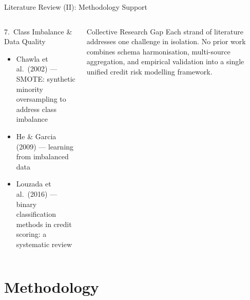 \documentclass[9pt,aspectratio=169]{beamer}
\begin{document}
\begin{frame}{Literature Review (II): Methodology Support}
\begin{columns}[T]
    \begin{block}{7.\ Class Imbalance \& Data Quality}
      \footnotesize
      \begin{itemize}\setlength\itemsep{2pt}
        \item Chawla et al.\ (2002) --- SMOTE: synthetic minority
              oversampling to address class imbalance
        \item He \& Garcia (2009) --- learning from imbalanced data
        \item Louzada et al.\ (2016) --- binary classification methods
              in credit scoring: a systematic review
      \end{itemize}
    \end{block}
    \vspace{5pt}
    \begin{alertblock}{Collective Research Gap}
      \footnotesize
      Each strand of literature addresses one challenge in isolation.
      No prior work combines schema harmonisation, multi-source
      aggregation, and empirical validation into a single unified
      credit risk modelling framework.
    \end{alertblock}
\end{columns}
\end{frame}

\section{Methodology}
\end{document}
